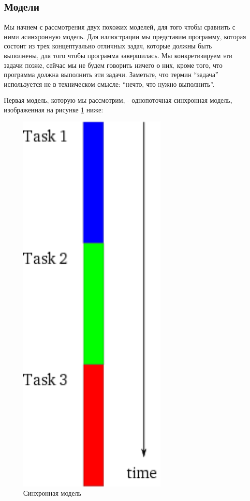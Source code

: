 \subsection{Модели}


    Мы начнем с рассмотрения двух похожих моделей,
для того чтобы сравнить с ними асинхронную модель.
Для иллюстрации мы представим программу, которая
состоит из трех концептуально отличных задач,
которые должны быть выполнены, для того чтобы программа
завершилась. Мы конкретизируем эти задачи позже, сейчас
мы не будем говорить ничего о них, кроме того, что программа
должна выполнить эти задачи. Заметьте, что термин ``задача'' 
используется не в техническом смысле: ``нечто, что нужно выполнить''.



Первая модель, которую мы рассмотрим, - однопоточная синхронная модель, изображенная 
на рисунке \ref{fig:sync} ниже:

\begin{figure}[h]
\begin{center}
    \includegraphics[height=0.3\textheight]{images/sync.pdf}
\end{center}
    \caption{Синхронная модель\label{fig:sync}}
\end{figure}

